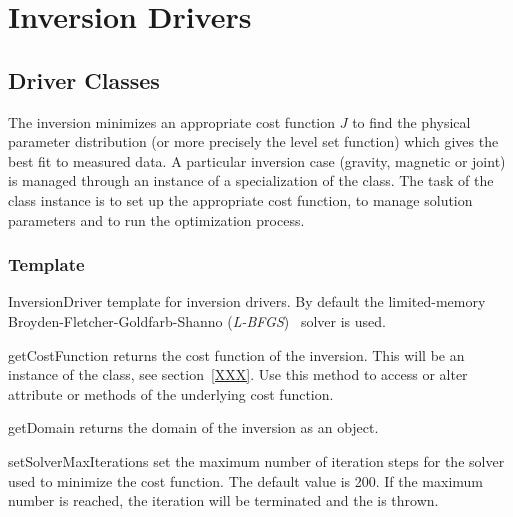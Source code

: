 
\chapter{Inversion Drivers}\label{chapter:ref:Drivers}

\section{Driver Classes}
The inversion minimizes an appropriate cost function $J$ to find the physical parameter distribution 
(or more precisely the level set function) which gives the best fit to measured data. A 
particular inversion case (gravity, magnetic or joint) is managed through 
an instance of a specialization of the  class. The task of the class instance
is to set up the appropriate cost function, to manage solution parameters and to run the optimization process.

\subsection{Template}
\begin{classdesc*}{InversionDriver}
template for inversion drivers. By default the limited-memory Broyden-Fletcher-Goldfarb-Shanno (\emph{L-BFGS})~\cite{L-BFGS} solver is used.
\end{classdesc*}
 
\begin{methoddesc}[InversionDriver]{getCostFunction}{}
returns the cost function of the inversion. This will be an instance of the  class, see section~\ref{XXX}.
Use this method to access or alter attribute or methods of the underlying cost function.
\end{methoddesc}

\begin{methoddesc}[InversionDriver]{getDomain}{}
returns the domain of the inversion as an \escript {} object.
\end{methoddesc}

        
\begin{methoddesc}[InversionDriver]{setSolverMaxIterations}{}
set the maximum number of iteration steps for the solver used to minimize the cost function. The default value is 200.
If the maximum number is reached, the iteration will be terminated and the  is thrown.
\end{methoddesc}

